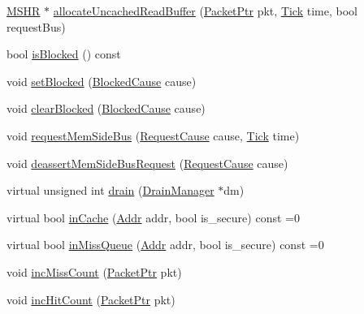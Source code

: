 \begin{DoxyCompactItemize}
\item 
\hyperlink{classMSHR}{MSHR} $\ast$ \hyperlink{classBaseCache_a8dfb4bae0c201cd12ca22dd159740541}{allocateUncachedReadBuffer} (\hyperlink{classPacket}{PacketPtr} pkt, \hyperlink{base_2types_8hh_a5c8ed81b7d238c9083e1037ba6d61643}{Tick} time, bool requestBus)
\item 
bool \hyperlink{classBaseCache_a798c4be15789e723465215258f41c29b}{isBlocked} () const 
\item 
void \hyperlink{classBaseCache_a79de24f2f3eda2cc3ac13f600d171bc0}{setBlocked} (\hyperlink{classBaseCache_a98297f294858ead7eafd19af93e64c6d}{BlockedCause} cause)
\item 
void \hyperlink{classBaseCache_a78948a7bd2b849859bfc6fee2fc3d070}{clearBlocked} (\hyperlink{classBaseCache_a98297f294858ead7eafd19af93e64c6d}{BlockedCause} cause)
\item 
void \hyperlink{classBaseCache_af0bf3b9e90ffddfd7762af4c5fd5247b}{requestMemSideBus} (\hyperlink{classBaseCache_a8ca466a3028d5dd05a9f31798a0115b8}{RequestCause} cause, \hyperlink{base_2types_8hh_a5c8ed81b7d238c9083e1037ba6d61643}{Tick} time)
\item 
void \hyperlink{classBaseCache_a7eb041ca3a51fe243525b95dea36f813}{deassertMemSideBusRequest} (\hyperlink{classBaseCache_a8ca466a3028d5dd05a9f31798a0115b8}{RequestCause} cause)
\item 
virtual unsigned int \hyperlink{classBaseCache_aa8a18d230dba7a674ac8a0b4f35bc36a}{drain} (\hyperlink{classDrainManager}{DrainManager} $\ast$dm)
\item 
virtual bool \hyperlink{classBaseCache_a2ac85ef6d4c6f16111c1da31c2363aa7}{inCache} (\hyperlink{base_2types_8hh_af1bb03d6a4ee096394a6749f0a169232}{Addr} addr, bool is\_\-secure) const =0
\item 
virtual bool \hyperlink{classBaseCache_abb47bf01a0bb0aa1c4e3d60fc2ca8175}{inMissQueue} (\hyperlink{base_2types_8hh_af1bb03d6a4ee096394a6749f0a169232}{Addr} addr, bool is\_\-secure) const =0
\item 
void \hyperlink{classBaseCache_a998427ec80c26469aae228b0d6bd9bd0}{incMissCount} (\hyperlink{classPacket}{PacketPtr} pkt)
\item 
void \hyperlink{classBaseCache_a5d0c42b459c95506252f8916dc4abc9c}{incHitCount} (\hyperlink{classPacket}{PacketPtr} pkt)
\end{DoxyCompactItemize}
